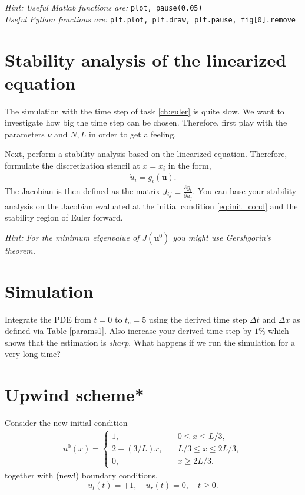 \documentclass[a4paper,10pt]{article}
\begin{document}
\textit{Hint: Useful Matlab functions are: } \texttt{plot, pause(0.05) }\\
\textit{\phantom{\indent Hint:} Useful Python functions are: } \texttt{plt.plot, plt.draw, plt.pause, fig[0].remove}
\section{Stability analysis of the linearized equation}
\label{eq:timestep}
The simulation with the time step of task \ref{ch:euler} is quite slow. We want to investigate how big the time step can be chosen. Therefore, first play with the parameters $\nu$ and $N,L$ in order to get a feeling.

Next, perform a stability analysis based on the linearized equation. Therefore, formulate the discretization stencil at $x=x_i$ in the form,
\begin{align*}
 \dot{u}_i = g_i(\mathbf{u}).
\end{align*}
The Jacobian is then defined as the matrix $J_{ij} = \frac{\partial g_i}{\partial u_j}$. You can base your stability analysis on the Jacobian evaluated at the initial condition \eqref{eq:init_cond} and the stability region of Euler forward.

\textit{Hint: For the minimum eigenvalue of $J(\mathbf{u}^0)$ you might use Gershgorin's theorem.}
\section{Simulation}
Integrate the PDE from $t=0$ to $t_e=5$ using the derived time step $\Delta t$ and $\Delta x$ as defined via Table \ref{params1}. Also increase your derived time step by $1\%$ which shows that the estimation is \textit{sharp}. What happens if we run the simulation for a very long time?

\section{Upwind scheme*}
Consider the new initial condition 
\begin{align*}
 u^0(x) = \begin{cases}
           1, &\quad 0 \leq x \leq L/3, \\
           2-(3/L) x, &\quad L/3 \leq x \leq 2L/3,\\
           0, &\quad x \geq 2L/3.
          \end{cases}
\end{align*}
together with (new!) boundary conditions,
\[
 u_l(t) = +1, \quad u_r(t) = 0, \quad t \geq 0.
\]
\end{document}
